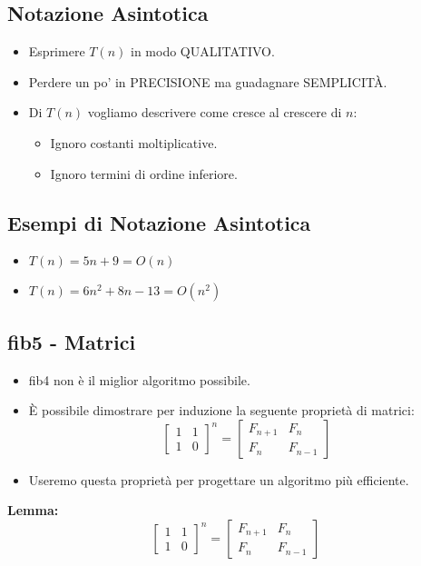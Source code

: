 \documentclass{article}
\begin{document}
\subsection{Notazione Asintotica}
\begin{itemize}
\item Esprimere $T(n)$ in modo QUALITATIVO.
\item Perdere un po' in PRECISIONE ma guadagnare SEMPLICITÀ.
\item Di $T(n)$ vogliamo descrivere come cresce al crescere di $n$:
  \begin{itemize}
  \item Ignoro costanti moltiplicative.
  \item Ignoro termini di ordine inferiore.
  \end{itemize}
\end{itemize}

\subsection{Esempi di Notazione Asintotica}
\begin{itemize}
\item $T(n) = 5n + 9 = O(n)$
\item $T(n) = 6n^2 + 8n - 13 = O(n^2)$
\end{itemize}

\subsection{fib5 - Matrici}
\begin{itemize}
\item fib4 non è il miglior algoritmo possibile.
\item È possibile dimostrare per induzione la seguente proprietà di matrici:
\[
\begin{bmatrix}
  1 & 1 \\
  1 & 0
\end{bmatrix}^n
=
\begin{bmatrix}
  F_{n+1} & F_n \\
  F_n & F_{n-1}
\end{bmatrix}
\]
\item Useremo questa proprietà per progettare un algoritmo più efficiente.
\end{itemize}

\textbf{Lemma:}
\[
\begin{bmatrix}
  1 & 1 \\
  1 & 0
\end{bmatrix}^n
=
\begin{bmatrix}
  F_{n+1} & F_n \\
  F_n & F_{n-1}
\end{bmatrix}
\]
\end{document}
